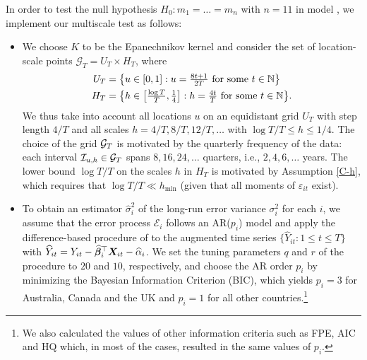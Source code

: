 \documentclass[a4paper,12pt]{article}
\makeatletter
\renewcommand{\eqref}[1]{\tagform@{\ref{#1}}}
\makeatother
\begin{document}
In order to test the null hypothesis $H_0: m_1 = \ldots = m_n$ with $n = 11$ in model \eqref{eq:model:app}, we implement our multiscale test as follows: 
\begin{itemize}[leftmargin=0.5cm]

\item We choose $K$ to be the Epanechnikov kernel and consider the set of location-scale points $\mathcal{G}_T = U_T \times H_T$, where 
\begin{align*}
U_T & = \big\{ u \in [0,1]: u = \textstyle{\frac{8t + 1}{2T}} \text{ for some } t \in \mathbb{N} \big\} \\
H_T & = \big\{ h \in \big[ \textstyle{\frac{\log T}{T}}, \textstyle{\frac{1}{4}} \big]:  h = \textstyle{\frac{4t}{T}} \text{ for some } t \in \mathbb{N} \big\}. 
\end{align*}
We thus take into account all locations $u$ on an equidistant grid $U_T$ with step length $4/T$ and all scales $h=4/T, 8/T, 12/T,\ldots$ with $\log T /T \le h \le 1/4$. 
The choice of the grid $\mathcal{G}_T$ is motivated by the quarterly frequency of the data: each interval $\mathcal{I}_{u, h} \in \mathcal{G}_T$ spans $8, 16, 24, \ldots$ quarters, i.e., $2, 4, 6, \ldots$ years. The lower bound $\log T / T$ on the scales $h$ in $H_T$ is motivated by Assumption \ref{C-h}, which requires that $\log T /T \ll h_{\min}$ (given that all moments of $\varepsilon_{it}$ exist).


\item To obtain an estimator $\hat{\sigma}_i^2$ of the long-run error variance $\sigma^2_i$ for each $i$, we assume that the error process $\mathcal{E}_i$ follows an AR($p_i$) model and apply the difference-based procedure of \cite{KhismatullinaVogt2020} to the augmented time series $\{\widehat{Y}_{it}: 1\leq t \leq T\}$ with $\widehat{Y}_{it} = Y_{it} - \widehat{\bm{\beta}}_i^\top \boldsymbol{X}_{it} - \widehat{\alpha}_{i}$. We set the tuning parameters $q$ and $r$ of the procedure to $20$ and $10$, respectively, and choose the AR order $p_i$ by minimizing the Bayesian Information Criterion (BIC), which yields $p_i = 3$ for Australia, Canada and the UK and $p_i = 1$ for all other countries.\footnote{We also calculated the values of other information criteria such as FPE, AIC and HQ which, in most of the cases, resulted in the same values of $p_i$.} 


\end{itemize}
\end{document}
